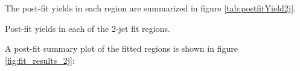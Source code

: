 
The post-fit yields in each region are summarized in figure \ref{tab:postfitYield2j}.

\begin{table}[H]
\begin{adjustwidth}{-3em}{-3em}

\label{tab:postfitYield2j}
\caption{Post-fit yields in each of the 2-jet fit regions.}                                                         
\end{adjustwidth}
\end{table}


A post-fit summary plot of the fitted regions is shown in figure \ref{fig:fit_results_2j}: 

